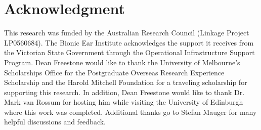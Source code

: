 \documentclass[a4paper]{IEEEtran}
\begin{document}
\section*{Acknowledgment}
This research was funded by the Australian Research Council (Linkage Project LP0560684). The Bionic Ear Institute acknowledges the support it receives from the Victorian State Government through the Operational Infrastructure Support Program. Dean Freestone would like to thank the University of Melbourne's Scholarships Office for the Postgraduate Overseas Research Experience Scholarship and the Harold Mitchell Foundation for a traveling scholarship for supporting this research. In addition, Dean Freestone would like to thank Dr. Mark van Rossum for hosting him while visiting the University of Edinburgh where this work was completed. Additional thanks go to Stefan Mauger for many helpful discussions and feedback.









%

% 
% 
% 
% 
% 
% 

\end{document}
